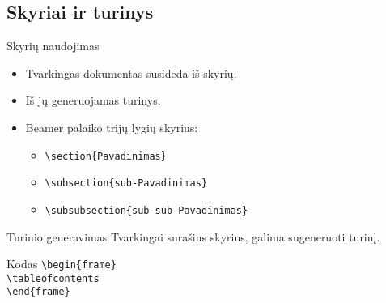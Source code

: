 \documentclass[11pt,a4paper]{beamer}
\begin{document}
\subsection{Skyriai ir turinys}
\begin{frame}[fragile]{Skyrių naudojimas}
    \begin{itemize}
        \item Tvarkingas dokumentas susideda iš skyrių.
        \item Iš jų generuojamas turinys.
        \item Beamer palaiko trijų lygių skyrius:
        \begin{itemize}
            \item \verb|\section{Pavadinimas}|
            \item \verb|\subsection{sub-Pavadinimas}|
            \item \verb|\subsubsection{sub-sub-Pavadinimas}|
        \end{itemize}
    \end{itemize}
\end{frame}
\begin{frame}[fragile]{Turinio generavimas}
    Tvarkingai surašius skyrius, galima sugeneruoti turinį.
    \begin{block}{Kodas}
\verb|\begin{frame}|\\
\verb|\tableofcontents|\\
\verb|\end{frame}|
    \end{block}
\end{frame}
\begin{frame}
    \tableofcontents
\end{frame}
\end{document}
